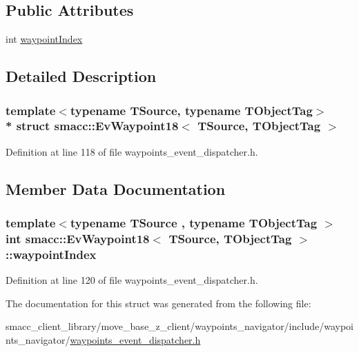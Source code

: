 \subsection*{Public Attributes}
\begin{DoxyCompactItemize}
\item 
int \hyperlink{structsmacc_1_1EvWaypoint18_aa0f8c5d0ec3de15599169322f514ec8d}{waypoint\+Index}
\end{DoxyCompactItemize}


\subsection{Detailed Description}
\subsubsection*{template$<$typename T\+Source, typename T\+Object\+Tag$>$\\*
struct smacc\+::\+Ev\+Waypoint18$<$ T\+Source, T\+Object\+Tag $>$}



Definition at line 118 of file waypoints\+\_\+event\+\_\+dispatcher.\+h.



\subsection{Member Data Documentation}
\subsubsection[{\texorpdfstring{waypoint\+Index}{waypointIndex}}]{\setlength{\rightskip}{0pt plus 5cm}template$<$typename T\+Source , typename T\+Object\+Tag $>$ int {\bf smacc\+::\+Ev\+Waypoint18}$<$ T\+Source, T\+Object\+Tag $>$\+::waypoint\+Index}\hypertarget{structsmacc_1_1EvWaypoint18_aa0f8c5d0ec3de15599169322f514ec8d}{}\label{structsmacc_1_1EvWaypoint18_aa0f8c5d0ec3de15599169322f514ec8d}


Definition at line 120 of file waypoints\+\_\+event\+\_\+dispatcher.\+h.



The documentation for this struct was generated from the following file\+:\begin{DoxyCompactItemize}
\item 
smacc\+\_\+client\+\_\+library/move\+\_\+base\+\_\+z\+\_\+client/waypoints\+\_\+navigator/include/waypoints\+\_\+navigator/\hyperlink{waypoints__event__dispatcher_8h}{waypoints\+\_\+event\+\_\+dispatcher.\+h}\end{DoxyCompactItemize}
